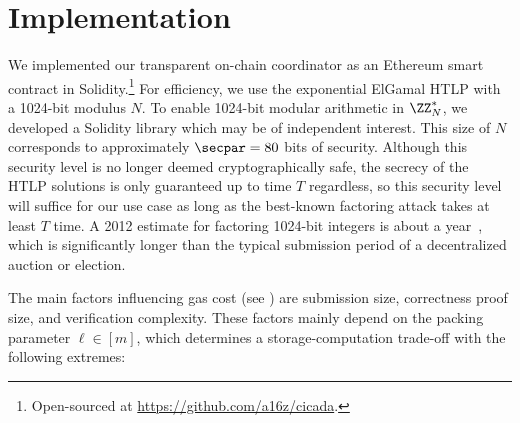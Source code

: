 \section{Implementation}\label{sec:implementation} 


We implemented our transparent on-chain coordinator as an Ethereum smart contract in Solidity.\footnote{Open-sourced at \url{https://github.com/a16z/cicada}.} 
For efficiency, we use the exponential ElGamal HTLP with a 1024-bit modulus $N$.
To enable 1024-bit modular arithmetic in $\ZZ_N^*$, we developed a Solidity library which may be of independent interest. 
This size of $N$ corresponds to approximately $\secpar=80$ bits of security.
Although this security level is no longer deemed cryptographically safe, the secrecy of the HTLP solutions is only guaranteed up to time $T$ regardless, so this security level will suffice for our use case as long as the best-known factoring attack takes at least $T$ time. A 2012 estimate for factoring 1024-bit integers is about a year~\cite{facthacks}, which is significantly longer than the typical submission period of a decentralized auction or election.

The main factors influencing gas cost (see ) are submission size, correctness proof size, and verification complexity. These factors mainly depend on the packing parameter $\ell\in[m]$, which determines a storage-computation trade-off with the following extremes:

